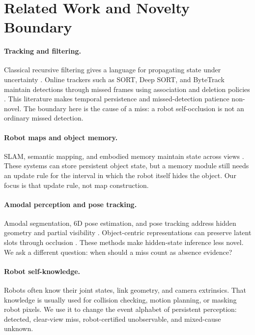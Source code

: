 \documentclass{article}
\begin{document}
\section{Related Work and Novelty Boundary}

\paragraph{Tracking and filtering.}
Classical recursive filtering gives a language for propagating state under
uncertainty \citep{kalman1960new,smith1986representation,thrun2005probabilistic}.
Online trackers such as SORT, Deep SORT, and ByteTrack maintain detections
through missed frames using association and deletion policies
\citep{bewley2016sort,wojke2017deepsort,zhang2022bytetrack}. This literature
makes temporal persistence and missed-detection patience non-novel. The
boundary here is the cause of a miss: a robot self-occlusion is not an ordinary
missed detection.

\paragraph{Robot maps and object memory.}
SLAM, semantic mapping, and embodied memory maintain state across views
\citep{durrant2006simultaneous,cadena2016past,teed2021droidslam,
parisotto2018neuralmap,kolve2017ai2thor,chaplot2020object}. These systems can
store persistent object state, but a memory module still needs an update rule
for the interval in which the robot itself hides the object. Our focus is that
update rule, not map construction.

\paragraph{Amodal perception and pose tracking.}
Amodal segmentation, 6D pose estimation, and pose tracking address hidden
geometry and partial visibility
\citep{li2016amodal,xiang2018posecnn,wang2019densefusion,wen2021bundletrack,
qi2019deep}. Object-centric representations can preserve latent slots through
occlusion \citep{greff2019multiobject,locatello2020objectcentric}. These
methods make hidden-state inference less novel. We ask a different question:
when should a miss count as absence evidence?

\paragraph{Robot self-knowledge.}
Robots often know their joint states, link geometry, and camera extrinsics.
That knowledge is usually used for collision checking, motion planning, or
masking robot pixels. We use it to change the event alphabet of persistent
perception: detected, clear-view miss, robot-certified unobservable, and
mixed-cause unknown.
\end{document}
